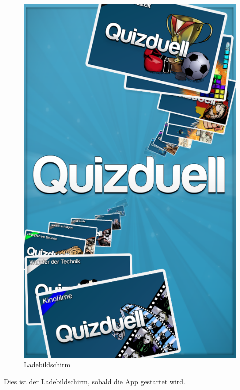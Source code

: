 \documentclass[fontsize=12pt,paper=a4,twoside]{scrartcl}
\begin{document}
\begin{figure}[H]
\centering
\includegraphics[scale=0.5]{Bilder/lade.png}
\caption{Ladebildschirm}
\end{figure}

Dies ist der Ladebildschirm, sobald die App gestartet wird.
\end{document}
